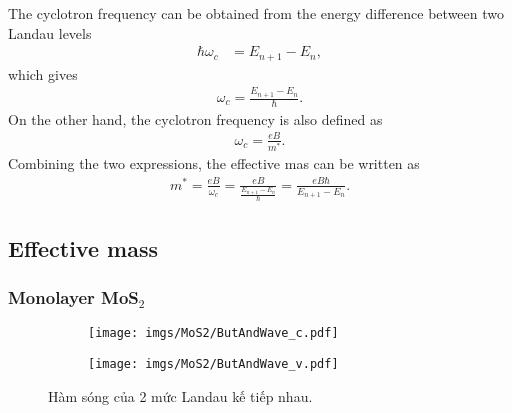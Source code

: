 \documentclass{article}
\begin{document}
%
%

The cyclotron frequency can be obtained from the energy difference between two Landau levels
\begin{equation}
	\begin{aligned}
		\hbar \omega_{c}       & = E_{n+1} - E_{n}  ,
	\end{aligned}
\end{equation}
which gives
\begin{gather}
	\omega_{c}  = \frac{E_{n+1} - E_{n}}{\hbar}.
\end{gather}
On the other hand, the cyclotron frequency is also defined as
\begin{gather}
	\omega_{c}         = \frac{eB}{m^{*}}.
\end{gather}
Combining the two expressions, the effective mas can be written as 
\begin{gather}
	m^{*}  =  \frac{eB}{\omega_{c}} = \frac{eB}{\frac{E_{n+1} - E_{n}}{\hbar}} = \frac{eB \hbar}{E_{n+1} - E_{n}}.
\end{gather}


\newpage
\subsection{Effective mass}
\subsubsection*{Monolayer MoS$_{2}$}

\begin{figure}[htb]
	\begin{subfigure}{0.495\textwidth}
		\centering
		\texttt{[image: imgs/MoS2/ButAndWave\_c.pdf]}
	\end{subfigure}
	\begin{subfigure}{0.495\textwidth}
		\centering
		\texttt{[image: imgs/MoS2/ButAndWave\_v.pdf]}
	\end{subfigure}
	\caption{Hàm sóng của 2 mức Landau kế tiếp nhau.}
\end{figure}
\end{document}

